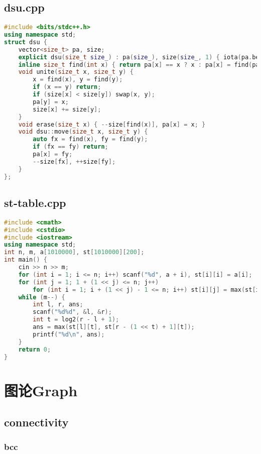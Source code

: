 \documentclass[9pt, a4paper, oneside]{book}
\begin{document}
\section{dsu.cpp}
\begin{lstlisting}[language={C++}]
#include <bits/stdc++.h>
using namespace std;
struct dsu {
    vector<size_t> pa, size;
    explicit dsu(size_t size_) : pa(size_), size(size_, 1) { iota(pa.begin(), pa.end(), 0); }
    inline size_t find(int x) { return pa[x] == x ? x : pa[x] = find(pa[x]); }
    void unite(size_t x, size_t y) {
        x = find(x), y = find(y);
        if (x == y) return;
        if (size[x] < size[y]) swap(x, y);
        pa[y] = x;
        size[x] += size[y];
    }
    void erase(size_t x) { --size[find(x)], pa[x] = x; }
    void dsu::move(size_t x, size_t y) {
        auto fx = find(x), fy = find(y);
        if (fx == fy) return;
        pa[x] = fy;
        --size[fx], ++size[fy];
    }
};
\end{lstlisting}
\section{st-table.cpp}
\begin{lstlisting}[language={C++}]
#include <cmath>
#include <cstdio>
#include <iostream>
using namespace std;
int n, m, a[1010000], st[1010000][200];
int main() {
    cin >> n >> m;
    for (int i = 1; i <= n; i++) scanf("%d", a + i), st[i][i] = a[i];
    for (int j = 1; 1 + (1 << j) <= n; j++)
        for (int i = 1; i + (1 << j) - 1 <= n; i++) st[i][j] = max(st[i][j - 1], st[i + (1 << j - 1)][j - 1]);
    while (m--) {
        int l, r, ans;
        scanf("%d%d", &l, &r);
        int t = log2(r - l + 1);
        ans = max(st[l][t], st[r - (1 << t) + 1][t]);
        printf("%d\n", ans);
    }
    return 0;
}\end{lstlisting}
\chapter{图论Graph}
\section{connectivity}
\subsection{bcc}
\end{document}
